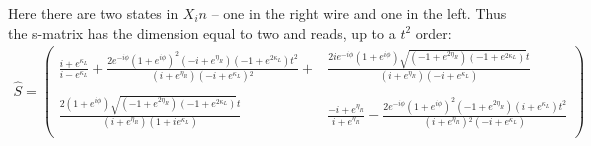 Here there are two states in $ X_in $ -- one in the right wire and one in the left. Thus the s-matrix has the dimension equal to two and reads, up to a $ t^2 $ order:
\begin{gather}
\!\!\!\!\!\!\!\!
\hat{S}
=
	\begin{pmatrix}
	\frac{i+e^{\kappa _L}}{i-e^{\kappa _L}}
	+
	\frac{2 e^{-i \phi } \left(1+e^{i \phi }\right)^2 \left(-i+e^{\eta _R}\right) \left(-1+e^{2 \kappa _L}\right) t^2}{\left(i+e^{\eta _R}\right) \left(-i+e^{\kappa _L}\right){}^2}+ & 
	\frac{2 i e^{-i \phi } \left(1+e^{i \phi }\right) \sqrt{\left(-1+e^{2 \eta _R}\right) \left(-1+e^{2 \kappa _L}\right)} t}{\left(i+e^{\eta _R}\right) \left(-i+e^{\kappa _L}\right)} \\
	~
	\\
	\frac{2 \left(1+e^{i \phi }\right) \sqrt{\left(-1+e^{2 \eta _R}\right) \left(-1+e^{2 \kappa _L}\right)} t}{\left(i+e^{\eta _R}\right) \left(1+i e^{\kappa _L}\right)} & 
	\frac{-i+e^{\eta _R}}{i+e^{\eta _R}}-\frac{2 e^{-i \phi } \left(1+e^{i \phi }\right)^2 \left(-1+e^{2 \eta _R}\right) \left(i+e^{\kappa _L}\right) t^2}{\left(i+e^{\eta _R}\right){}^2 \left(-i+e^{\kappa _L}\right)} \\
	\end{pmatrix}
\end{gather}